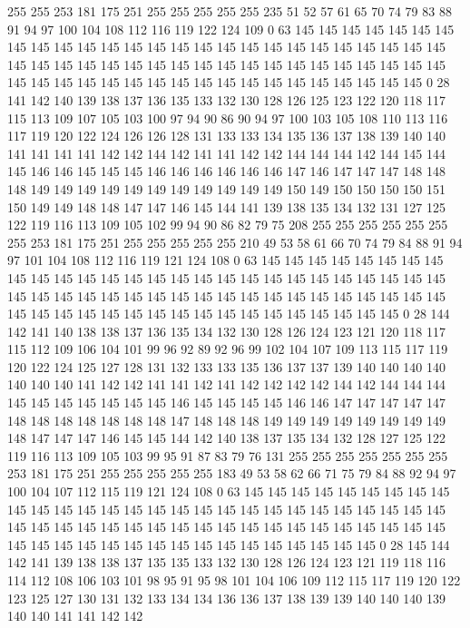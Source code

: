 255 255 253 181 175 251 255 255 255 255 255 235 51 52 57 61 65 70 74 79
83 88 91 94 97 100 104 108 112 116 119 122 124 109 0 63 145 145 145 145
145 145 145 145 145 145 145 145 145 145 145 145 145 145 145 145 145 145 145 145
145 145 145 145 145 145 145 145 145 145 145 145 145 145 145 145 145 145 145 145
145 145 145 145 145 145 145 145 145 145 145 145 145 145 145 145 145 145 145 0
28 141 142 140 139 138 137 136 135 133 132 130 128 126 125 123 122 120 118 117
115 113 109 107 105 103 100 97 94 90 86 90 94 97 100 103 105 108 110 113
116 117 119 120 122 124 126 126 128 131 133 133 134 135 136 137 138 139 140 140
141 141 141 141 142 142 144 142 141 141 142 142 144 144 144 142 144 145 144 145
146 146 145 145 145 146 146 146 146 146 146 147 146 147 147 147 148 148 148 149
149 149 149 149 149 149 149 149 149 149 150 149 150 150 150 150 151 150 149 149
148 148 147 147 146 145 144 141 139 138 135 134 132 131 127 125 122 119 116 113
109 105 102 99 94 90 86 82 79 75 208 255 255 255 255 255 255 255 253 181
175 251 255 255 255 255 255 210 49 53 58 61 66 70 74 79 84 88 91 94
97 101 104 108 112 116 119 121 124 108 0 63 145 145 145 145 145 145 145 145
145 145 145 145 145 145 145 145 145 145 145 145 145 145 145 145 145 145 145 145
145 145 145 145 145 145 145 145 145 145 145 145 145 145 145 145 145 145 145 145
145 145 145 145 145 145 145 145 145 145 145 145 145 145 145 0 28 144 142 141
140 138 138 137 136 135 134 132 130 128 126 124 123 121 120 118 117 115 112 109
106 104 101 99 96 92 89 92 96 99 102 104 107 109 113 115 117 119 120 122
124 125 127 128 131 132 133 133 135 136 137 137 139 140 140 140 140 140 140 140
141 142 142 141 141 142 141 142 142 142 142 144 142 144 144 144 145 145 145 145
145 145 145 146 145 145 145 145 146 146 147 147 147 147 147 148 148 148 148 148
148 148 147 148 148 148 149 149 149 149 149 149 149 149 148 147 147 147 146 145
145 144 142 140 138 137 135 134 132 128 127 125 122 119 116 113 109 105 103 99
95 91 87 83 79 76 131 255 255 255 255 255 255 255 253 181 175 251 255 255
255 255 255 183 49 53 58 62 66 71 75 79 84 88 92 94 97 100 104 107
112 115 119 121 124 108 0 63 145 145 145 145 145 145 145 145 145 145 145 145
145 145 145 145 145 145 145 145 145 145 145 145 145 145 145 145 145 145 145 145
145 145 145 145 145 145 145 145 145 145 145 145 145 145 145 145 145 145 145 145
145 145 145 145 145 145 145 145 145 145 145 0 28 145 144 142 141 139 138 138
137 135 135 133 132 130 128 126 124 123 121 119 118 116 114 112 108 106 103 101
98 95 91 95 98 101 104 106 109 112 115 117 119 120 122 123 125 127 130 131
132 133 134 134 136 136 137 138 139 139 140 140 140 139 140 140 141 141 142 142

